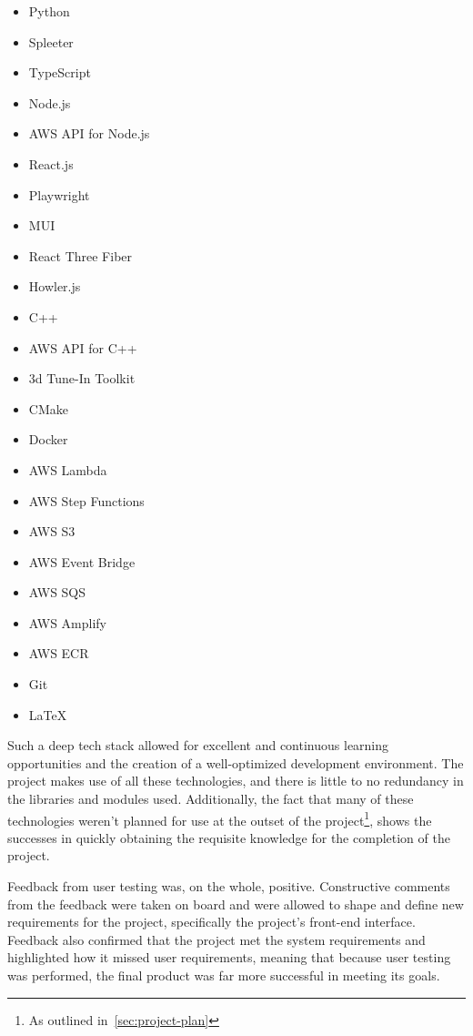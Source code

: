 \begin{itemize}
    \item Python
    \item Spleeter
    \item TypeScript
    \item Node.js
    \item AWS API for Node.js
    \item React.js
    \item Playwright
    \item MUI
    \item React Three Fiber
    \item Howler.js
    \item C++
    \item AWS API for C++
    \item 3d Tune-In Toolkit
    \item CMake
    \item Docker
    \item AWS Lambda
    \item AWS Step Functions
    \item AWS S3
    \item AWS Event Bridge
    \item AWS SQS
    \item AWS Amplify
    \item AWS ECR
    \item Git
    \item LaTeX
\end{itemize}

Such a deep tech stack
allowed for excellent and continuous learning opportunities and the creation of a well-optimized development environment.
The project makes use of all these technologies, and there is little to no redundancy in the libraries and modules used.
Additionally,
the fact
that many of these technologies weren't planned for use at the outset of the project\footnote{As outlined in~\ref{sec:project-plan}},
shows the successes in quickly obtaining the requisite knowledge for the completion of the project.

Feedback from user testing was, on the whole, positive.
Constructive comments from the feedback were taken on board
and were allowed to shape and define new requirements for the project, specifically the project's front-end interface.
Feedback also confirmed that the project met the system requirements and highlighted how it missed user requirements,
meaning that because user testing was performed, the final product was far more successful in meeting its goals.

